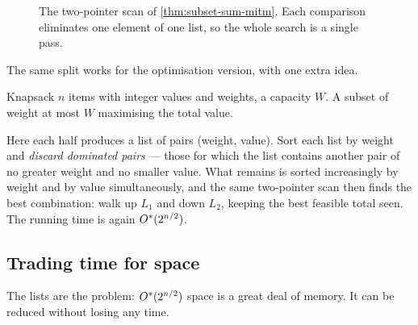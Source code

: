 \begin{figure}[ht]
\centering
{}
\caption{The two-pointer scan of \cref{thm:subset-sum-mitm}. Each comparison
eliminates one element of one list, so the whole search is a single pass.}
\label{fig:mitm-scan}
\end{figure}

The same split works for the optimisation version, with one extra idea.

\begin{probdef}{Knapsack}
  \instance $n$ items with integer values and weights, a capacity $W$.
  \question A subset of weight at most $W$ maximising the total value.
\end{probdef}

Here each half produces a list of pairs (weight, value). Sort each list by
weight and \emph{discard dominated pairs} --- those for which the list contains
another pair of no greater weight and no smaller value. What remains is sorted
increasingly by weight and by value simultaneously, and the same two-pointer
scan then finds the best combination: walk up $L_1$ and down $L_2$, keeping the
best feasible total seen. The running time is again $O^{*}(2^{n/2})$.

\subsection{Trading time for space}

The lists are the problem: $O^{*}(2^{n/2})$ space is a great deal of memory. It
can be reduced without losing any time.


